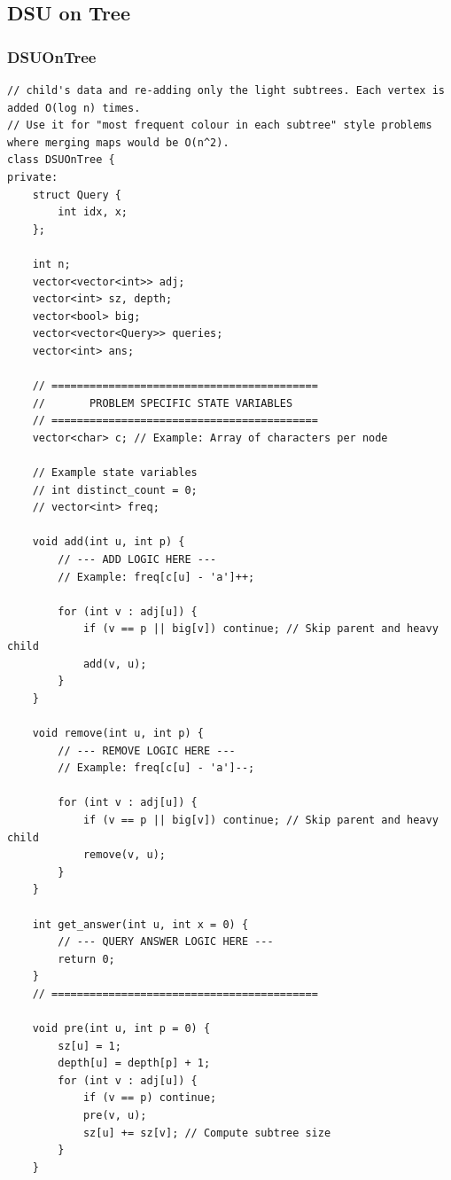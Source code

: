 \documentclass[9pt,a4paper,twocolumn]{extarticle}
\begin{document}
\subsection{DSU on Tree}

\filbreak
\subsubsection{DSUOnTree}
\nopagebreak
\begin{lstlisting}
// child's data and re-adding only the light subtrees. Each vertex is added O(log n) times.
// Use it for "most frequent colour in each subtree" style problems where merging maps would be O(n^2).
class DSUOnTree {
private:
    struct Query {
        int idx, x;
    };

    int n;
    vector<vector<int>> adj;
    vector<int> sz, depth;
    vector<bool> big;
    vector<vector<Query>> queries;
    vector<int> ans;

    // ==========================================
    //       PROBLEM SPECIFIC STATE VARIABLES
    // ==========================================
    vector<char> c; // Example: Array of characters per node
    
    // Example state variables
    // int distinct_count = 0;
    // vector<int> freq;

    void add(int u, int p) {
        // --- ADD LOGIC HERE ---
        // Example: freq[c[u] - 'a']++;

        for (int v : adj[u]) {
            if (v == p || big[v]) continue; // Skip parent and heavy child
            add(v, u);
        }
    }

    void remove(int u, int p) {
        // --- REMOVE LOGIC HERE ---
        // Example: freq[c[u] - 'a']--;

        for (int v : adj[u]) {
            if (v == p || big[v]) continue; // Skip parent and heavy child
            remove(v, u);
        }
    }

    int get_answer(int u, int x = 0) {
        // --- QUERY ANSWER LOGIC HERE ---
        return 0; 
    }
    // ==========================================

    void pre(int u, int p = 0) {
        sz[u] = 1;
        depth[u] = depth[p] + 1;
        for (int v : adj[u]) {
            if (v == p) continue;
            pre(v, u);
            sz[u] += sz[v]; // Compute subtree size
        }
    }


\end{lstlisting}
\end{document}
